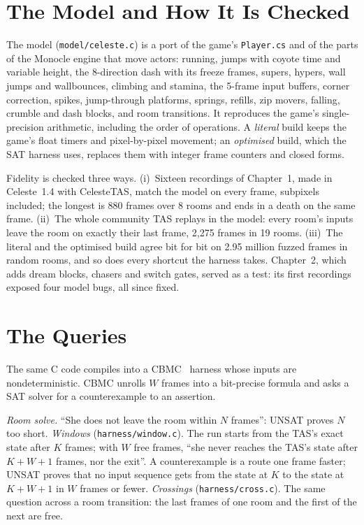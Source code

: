 \documentclass[conference]{IEEEtran}
\newcommand{\code}[1]{\texttt{#1}}
\begin{document}
\section{The Model and How It Is Checked}
The model (\code{model/celeste.c}) is a port of the game's
\code{Player.cs} and of the parts of the Monocle engine that move actors:
running, jumps with coyote time and variable height, the 8-direction dash
with its freeze frames, supers, hypers, wall jumps and wallbounces, climbing
and stamina, the 5-frame input buffers, corner correction, spikes,
jump-through platforms, springs, refills, zip movers, falling, crumble and
dash blocks, and room transitions. It reproduces the game's single-precision
arithmetic, including the order of operations. A \emph{literal} build keeps
the game's float timers and pixel-by-pixel movement; an \emph{optimised}
build, which the SAT harness uses, replaces them with integer frame counters and
closed forms.

Fidelity is checked three ways. (i)~Sixteen recordings of Chapter~1, made
in Celeste~1.4 with CelesteTAS, match the model on every frame, subpixels
included; the longest is 880 frames over 8 rooms and ends in a death on the
same frame. (ii)~The whole community TAS replays in the model: every room's
inputs leave the room on exactly their last frame, 2,275 frames in 19 rooms.
(iii)~The literal and the optimised build agree bit for bit on 2.95 million
fuzzed frames in random rooms, and so does every shortcut the harness takes.
Chapter~2, which adds dream blocks, chasers and switch gates, served as a
test: its first recordings exposed four model bugs, all since fixed.

\section{The Queries}
The same C code compiles into a CBMC~\cite{cbmc} harness whose inputs are
nondeterministic. CBMC unrolls $W$ frames into a bit-precise formula and
asks a SAT solver for a counterexample to an assertion.

\emph{Room solve.} ``She does not leave the room within $N$ frames'':
UNSAT proves $N$ too short.
\emph{Windows} (\code{harness/window.c}). The run starts from the TAS's exact
state after $K$ frames; with $W$ free frames, ``she never reaches the TAS's
state after $K{+}W{+}1$ frames, nor the exit''. A counterexample is a route one frame faster; UNSAT
proves that no input sequence gets from the state at $K$ to the state at
$K{+}W{+}1$ in $W$ frames or fewer.
\emph{Crossings} (\code{harness/cross.c}). The same question across a room
transition: the last frames of one room and the first of the next are free.
\end{document}
